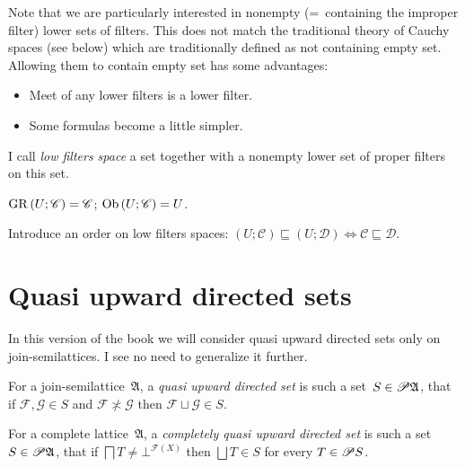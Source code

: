 \begin{rem}
Note that we are particularly interested in nonempty (=~containing the improper filter) lower sets of filters.
This does not match the traditional theory of Cauchy spaces (see below) which are traditionally defined as not containing empty set.
Allowing them to contain empty set has some advantages:
\begin{itemize}
\item Meet of any lower filters is a lower filter.
\item Some formulas become a little simpler.
\end{itemize}
\end{rem}


\begin{defn}
  I call \emph{low filters space} a set together with a nonempty lower set of proper
  filters on this set. 
\end{defn}

\begin{defn}
  $\operatorname{GR} \left( U ; \mathscr{C} \right) = \mathscr{C}$; $\operatorname{Ob} \left(
  U ; \mathscr{C} \right) = U$.
\end{defn}

\begin{defn}
  Introduce an order on low filters spaces: $\left( U ; \mathscr{C} \right)
  \sqsubseteq \left( U ; \mathscr{D} \right) \Leftrightarrow \mathscr{C}
  \sqsubseteq \mathscr{D}$.
\end{defn}

\section{Quasi upward directed sets}

\begin{rem}
In this version of the book we will consider quasi upward directed sets only on join-semilattices. I see no need to generalize it further.
\end{rem}

\begin{defn}
For a join-semilattice~$\mathfrak{A}$, a \emph{quasi upward directed set} is such a set~$S\in\mathscr{P}\mathfrak{A}$, that
if $\mathcal{F},\mathcal{G}\in S$ and $\mathcal{F} \nasymp \mathcal{G}$ then $\mathcal{F} \sqcup \mathcal{G}\in S$.
\end{defn}

\begin{defn}
For a complete lattice~$\mathfrak{A}$, a \emph{completely quasi upward directed set} is such a set~$S\in\mathscr{P}\mathfrak{A}$, that
if $\bigsqcap T \neq \bot^{\mathscr{F}(X)}$ then $\bigsqcup T\in S$ for every $T\in\mathscr{P} S$. 
\end{defn}

